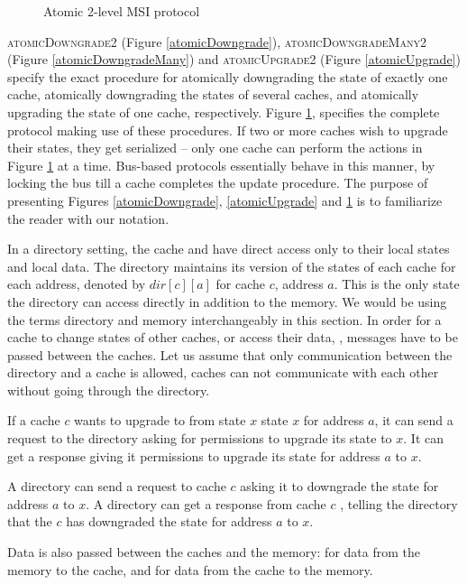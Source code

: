 \begin{figure}
\caption{Atomic 2-level MSI protocol}
\label{atomic}
\end{figure}

\textsc{atomicDowngrade2} (Figure \ref{atomicDowngrade}),
\textsc{atomicDowngradeMany2} (Figure \ref{atomicDowngradeMany}) and
\textsc{atomicUpgrade2} (Figure \ref{atomicUpgrade}) specify the exact
procedure for atomically downgrading the state of exactly one cache, atomically
downgrading the states of several caches, and atomically upgrading the state of
one cache, respectively. Figure \ref{atomic}, specifies the complete protocol
making use of these procedures. If two or more caches wish to upgrade their
states, they get serialized -- only one cache can perform the actions in Figure
\ref{atomic} at a time. Bus-based protocols essentially behave in this manner,
by locking the bus till a cache completes the update procedure.  The purpose of
presenting Figures \ref{atomicDowngrade}, \ref{atomicUpgrade} and \ref{atomic}
is to familiarize the reader with our notation. 

In a directory setting, the cache and have direct access only to their local
states and local data. The directory maintains its version of the states of each
cache for each address, denoted by $dir[c][a]$ for cache $c$, address $a$. This
is the only state the directory can access directly in addition to the memory.
We would be using the terms directory and memory interchangeably in this
section. In order for a cache to change states of other caches, or access their
data, \etc, messages have to be passed between the caches. Let us assume that
only communication between the directory and a cache is allowed, caches can not
communicate with each other without going through the directory.

If a cache $c$ wants to upgrade to from state $x$ state $x$ for address $a$, it
can send a request  to the directory asking for permissions
to upgrade its state to $x$. It can get a response  giving
it permissions to upgrade its state for address $a$ to $x$.

A directory can send a request  to cache $c$ asking it to
downgrade the state for address $a$ to $x$. A directory can get a response from
cache $c$ , telling the directory that the $c$ has
downgraded the state for address $a$ to $x$.

Data is also passed between the caches and the memory:  for
data from the memory to the cache, and  for data from the
cache to the memory.

